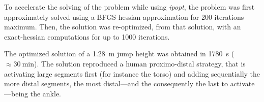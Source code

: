 To accelerate the solving of the problem while using \emph{ipopt}, the problem was first approximately solved using a BFGS hessian approximation for 200 iterations maximum.
Then, the solution was re-optimized, from that solution, with an exact-hessian computations for up to 1000 iterations.

The optimized solution of a \SI{1.28}{\meter} jump height was obtained in \SI{1780}{\second} ($\approx\SI{30}{\minute}$).
The solution reproduced a human proximo-distal strategy, that is activating large segments first (for instance the torso) and adding sequentially the more distal segments, the most distal---and the consequently the last to activate---being the ankle.

